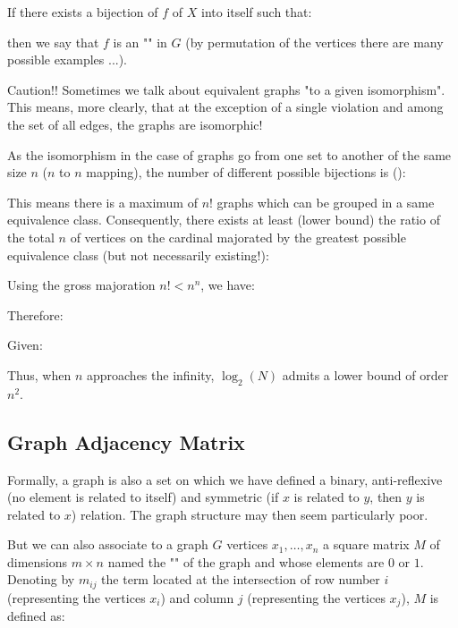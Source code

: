 {\begin{enumerate}
		If there exists a bijection of $f$ of $X$ into itself such that:
		
		then we say that $f$ is an "" in $G$ (by permutation of the vertices there are many possible examples ...).
		
		\begin{tcolorbox}[title=Remark,colframe=black,arc=10pt]
		Caution!! Sometimes we talk about equivalent graphs "to a given isomorphism". This means, more clearly, that at the exception of a single violation and among the set of all edges, the graphs are isomorphic!
		\end{tcolorbox}
		As the isomorphism in the case of graphs go from one set to another of the same size $n$ ($n$ to $n$ mapping), the number of different possible bijections is ():
		
		This means there is a maximum of $n!$ graphs which can be grouped in a same equivalence class. Consequently, there exists at least (lower bound) the ratio of the total $n$ of vertices on the cardinal majorated by the greatest possible equivalence class (but not necessarily existing!):
			
		Using the gross majoration $n!<n^n$, we have:
		
		Therefore:
		
		Given:
		
		Thus, when $n$ approaches the infinity, $\log_2(N)$ admits a lower bound of order $n^2$.
	\end{enumerate}
	
	\pagebreak
	\subsection{Graph Adjacency Matrix}\label{adjacency matrix}
	Formally, a graph is also a set on which we have defined a binary, anti-reflexive (no element is related to itself) and symmetric (if $x$ is related to $y$, then $y$ is related to $x$) relation. The graph structure may then seem particularly poor.
	
	But we can also associate to a graph $G$ vertices $x_1,\ldots, x_n$ a square matrix $M$ of dimensions $m\times n$ named the "" of the graph and whose elements are $0$ or $1$. Denoting by $m_{ij}$ the term located at the intersection of row number $i$ (representing the vertices $x_i$) and column $j$ (representing the vertices $x_j$), $M$ is defined as:
	
}
